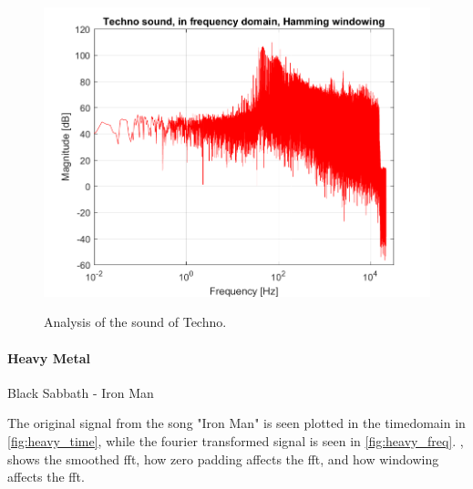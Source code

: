 \begin{figure}[htb!]
	{\includegraphics[width=0.45\linewidth]{code/Techno_figure5.png}}
	\caption{Analysis of the sound of Techno.}\label{fig:techno}
\end{figure}

\paragraph{Heavy Metal}
Black Sabbath - Iron Man

The original signal from the song "Iron Man" is seen plotted in the timedomain in \cref{fig:heavy_time}, while the fourier transformed signal is seen in \cref{fig:heavy_freq}. , shows the smoothed fft, how zero padding affects the fft, and how windowing affects the fft.


